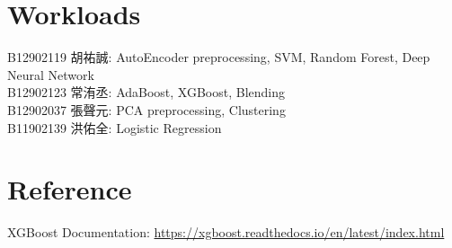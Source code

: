 \documentclass[11pt,a4paper]{article}
\begin{document}
\section{Workloads}
B12902119 胡祐誠: AutoEncoder preprocessing, SVM, Random Forest, Deep Neural Network\\
B12902123 常洧丞: AdaBoost, XGBoost, Blending\\
B12902037 張聲元: PCA preprocessing, Clustering\\
B11902139 洪佑全: Logistic Regression\\

\section{Reference}
XGBoost Documentation: \url{https://xgboost.readthedocs.io/en/latest/index.html}
\end{document}
